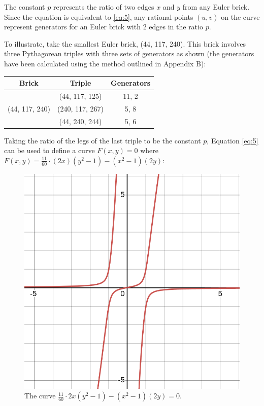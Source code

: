 \documentclass[11pt]{article}
\begin{document}
The constant $p$ represents the ratio of two edges $x$ and $y$ from any Euler brick. Since the equation is equivalent to \eqref{eq:5}, any rational points $(u, v)$ on the curve represent generators for an Euler brick with 2 edges in the ratio $p$. 

To illustrate, take the smallest Euler brick, (44, 117, 240). This brick involves three Pythagorean triples with three sets of generators as shown (the generators have been calculated using the method outlined in Appendix B):

\begin{table}[H]
	\centering
	\begin{tabular}{| c | c | c |}
		\hline
		Brick & Triple & Generators\\
		\hline \hline 
		\multirow{3}{*}{(44, 117, 240)} & (44, 117, 125) & {11, 2} \\ \cline{2-3}
		& (240, 117, 267) & {5, 8}  \\ \cline{2-3}
		& (44, 240, 244) & {5, 6} \\ \hline
	\end{tabular}
\end{table}

Taking the ratio of the legs of the last triple to be the constant $p$, Equation \eqref{eq:5} can be used to define a curve $F(x,y)=0$ where $F(x,y)=\frac{11}{60}\cdot(2x)(y^2-1)-(x^2-1)(2y)$:
\begin{figure}[h]
	\centering
	\includegraphics[scale=0.25]{4.png}
	\caption{The curve $\frac{11}{60}\cdot2x(y^2-1)-(x^2-1)(2y)=0$.}
\end{figure}
\end{document}
